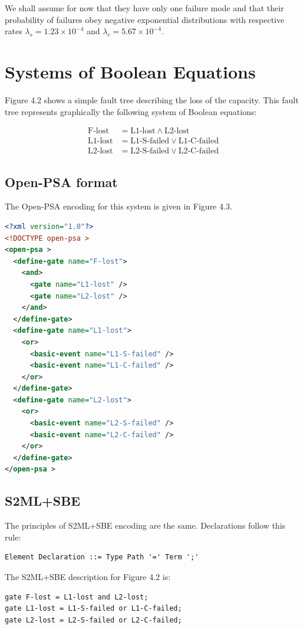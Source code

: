 We shall assume for now that they have only one failure mode and that their probability of failures obey negative exponential distributions with respective rates $\lambda_{s}=1.23\times10^{-4}$ and $\lambda_{c}=5.67\times10^{-4}$.

\section{Systems of Boolean Equations}
Figure 4.2 shows a simple fault tree describing the loss of the capacity. This fault tree represents graphically the following system of Boolean equations:

\begin{align*}
\text{F-lost} &= \text{L1-lost} \wedge \text{L2-lost} \\
\text{L1-lost} &= \text{L1-S-failed} \vee \text{L1-C-failed} \\
\text{L2-lost} &= \text{L2-S-failed} \vee \text{L2-C-failed}
\end{align*}

\subsection{Open-PSA format}
The Open-PSA encoding for this system is given in Figure 4.3.

\begin{lstlisting}[language=XML, caption={Open-PSA description of the fault tree}]
<?xml version="1.0"?>
<!DOCTYPE open-psa >
<open-psa >
  <define-gate name="F-lost">
    <and>
      <gate name="L1-lost" />
      <gate name="L2-lost" />
    </and>
  </define-gate>
  <define-gate name="L1-lost">
    <or>
      <basic-event name="L1-S-failed" />
      <basic-event name="L1-C-failed" />
    </or>
  </define-gate>
  <define-gate name="L2-lost">
    <or>
      <basic-event name="L2-S-failed" />
      <basic-event name="L2-C-failed" />
    </or>
  </define-gate>
</open-psa >
\end{lstlisting}

\subsection{S2ML+SBE}
The principles of S2ML+SBE encoding are the same. Declarations follow this rule:
\begin{lstlisting}
Element Declaration ::= Type Path '=' Term ';'
\end{lstlisting}

The S2ML+SBE description for Figure 4.2 is:
\begin{lstlisting}
gate F-lost = L1-lost and L2-lost;
gate L1-lost = L1-S-failed or L1-C-failed;
gate L2-lost = L2-S-failed or L2-C-failed;
\end{lstlisting}


